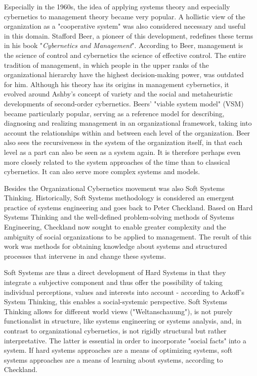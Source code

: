 \documentclass[a4paper,12pt]{scrartcl}
\begin{document}
Especially in the 1960s, the idea of applying systems theory and especially cybernetics to management theory became very popular. A hollistic view of the organization as a "cooperative system" was also considered necessary and useful in this domain.\cite{jackson:1991} Stafford Beer, a pioneer of this development, redefines these terms in his book "\textit{Cybernetics and Management}". According to Beer, management is the science of control and cybernetics the science of effective control. The entire tradition of management, in which people in the upper ranks of the organizational hierarchy have the highest decision-making power, was outdated for him.\cite{beer:1959} Although his theory has its origins in management cybernetics, it evolved around Ashby's concept of variety and the social and metaheuristic developments of second-order cybernetics. Beers' "viable system model" (VSM) became particularly popular, serving as a reference model for describing, diagnosing and realizing management in an organizational framework, taking into account the relationships within and between each level of the organization. Beer also sees the recursiveness in the system of the organization itself, in that each level as a part can also be seen as a system again. It is therefore perhaps even more closely related to the system approaches of the time than to classical cybernetics. It can also serve more complex systems and models.\cite{jackson:2003}

Besides the Organizational Cybernetics movement was also Soft Systems Thinking. Historically, Soft Systems methodology is considered an emergent practice of systems engineering and goes back to Peter Checkland. Based on Hard Systems Thinking and the well-defined problem-solving methods of Systems Engineering, Checkland now sought to enable greater complexity and the ambiguity of social organizations to be applied to management. The result of this work was methods for obtaining knowledge about systems and structured processes that intervene in and change these systems.\cite{jackson:1991}

Soft Systems are thus a direct development of Hard Systems in that they integrate a subjective component and thus offer the possibility of taking individual perceptions, values and interests into account - according to Ackoff's System Thinking, this enables a social-systemic perspective. Soft Systems Thinking allows for different world views ("Weltanschauung"), is not purely functionalist in structure, like systems engineering or systems analysis, and, in contrast to organizational cybernetics, is not rigidly structural but rather interpretative. The latter is essential in order to incorporate "social facts" into a system. If hard systems approaches are a means of optimizing systems, soft systems approaches are a means of learning about systems, according to Checkland.\cite{checkland:1983}
\end{document}
